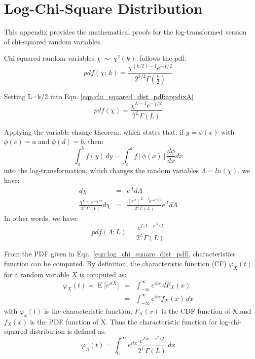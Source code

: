 \appendix

\chapter{Log-Chi-Square Distribution}
\label{chap:appendix_a}

This appendix provides the mathematical proofs for the log-transformed version of chi-squared random variables.

Chi-squared random variables $\chi\ \sim\ \chi^2(k)\ $ follows the pdf:
\begin{equation}
pdf(\chi;\,k) =
  \frac{\chi^{(k/2)-1} e^{-\chi/2}}{2^{k/2} \Gamma\left(\frac{k}{2}\right)}  
\label{eqn:chi_squared_dist_pdf:appdixA}
\end{equation}

Setting L=k/2 into Eqn. \ref{eqn:chi_squared_dist_pdf:appdixA}
\begin{equation}
pdf(\chi) = \frac{\chi^{L-1}e^{-\chi/2}}{2^L\Gamma(L)}
\end{equation}

Applying the variable change theorem, which states that: if $y=\phi(x)$ with $\phi(c)=a$ and $\phi(d)=b$, then:
\begin{equation}
 \int_a^b \! f(y) \, dy = \int_c^d \! f[\phi(x)] \frac{d\phi}{dx} dx
\end{equation}
into the log-transformation, which changes the random variables $\Lambda=ln(\chi)$, we have:
\begin{eqnarray*}
  d\chi &=& e^\Lambda d\Lambda \\
  \frac{\chi^{L-1}e^{-\chi/2}}{2^L\Gamma(L)} d\chi &=&  \frac{(e^\Lambda)^{L-1}e^{-e^\Lambda/2}}{2^L\Gamma(L)} e^\Lambda d\Lambda
\end{eqnarray*}
In other words, we have:
\begin{equation}
pdf(\Lambda;L) = \frac{e^{L \Lambda -e^\Lambda/2}}{2^L\Gamma(L)}
\label{eqn:log_chi_square_dist_pdf}
\end{equation}

From the PDF given in Eqn. \ref{eqn:log_chi_square_dist_pdf}, characteristics function can be computed.
By definition, the characteristic function (CF) $\varphi_X(t)$ for a random variable $X$ is computed as:
\begin{eqnarray*}
\varphi_X(t) = \operatorname{E}\big[e^{itX}\big] 
      &=& \int_{-\infty}^\infty e^{itx}\,dF_X(x) \\ 
      &=& \int_{-\infty}^\infty e^{itx} f_X(x)\,dx 
\end{eqnarray*}
with $\varphi_x(t)$ is the characteristic function,
     $F_X(x)$ is the CDF function of X and
     $f_X(x)$ is the PDF function of X.
Thus the characteristic function for log-chi-squared distribution is defined as: 
\begin{equation}
\varphi_\Lambda(t)=\int_0^\infty e^{itx} \frac{e^{Lx-e^x/2}}{2^L \Gamma(L)}\,dx 
\end{equation}

